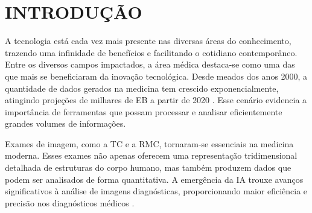 \chapter{INTRODUÇÃO}
\label{chap:intro}

A tecnologia está cada vez mais presente nas diversas áreas do conhecimento, trazendo uma infinidade de benefícios e facilitando o cotidiano contemporâneo. Entre os diversos campos impactados, a área médica destaca-se como uma das que mais se beneficiaram da inovação tecnológica. Desde meados dos anos 2000, a quantidade de dados gerados na medicina tem crescido exponencialmente, atingindo projeções de milhares de \gls{EB} a partir de 2020 \cite{gantzDIGITALUNIVERSE2020}. Esse cenário evidencia a importância de ferramentas que possam processar e analisar eficientemente grandes volumes de informações.


Exames de imagem, como a \gls{TC} e a \gls{RMC}, tornaram-se essenciais na medicina moderna. Esses exames não apenas oferecem uma representação tridimensional detalhada de estruturas do corpo humano, mas também produzem dados que podem ser analisados de forma quantitativa. A emergência da \gls{IA} trouxe avanços significativos à análise de imagens diagnósticas, proporcionando maior eficiência e precisão nos diagnósticos médicos \cite{argentieroApplicationsArtificialIntelligence2022}.


